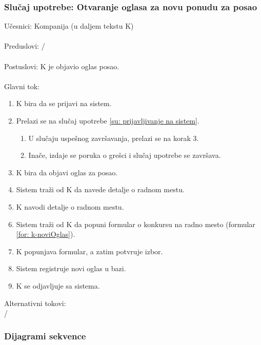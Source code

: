 \subsubsection{Slu\v caj upotrebe: Otvaranje oglasa za novu ponudu za posao}
\label{su: otvaranje oglasa za novu ponudu za posao}

\noindent U\v cesnici: Kompanija (u daljem tekstu K)
\\
\\ Preduslovi: /
\\
\\ Postuslovi: K je objavio oglas posao.
\\ 
\\ Glavni tok:
\begin{enumerate}
	\item K bira da se prijavi na sistem.
	\item Prelazi se na slu\v caj upotrebe \ref{su: prijavljivanje na sistem}.
	\begin{enumerate}
		\item U slu\v caju uspe\v snog zavr\v savanja, prelazi se na korak 3.
		\item Ina\v ce, izdaje se poruka o gre\v sci i slu\v caj upotrebe se zavr\v sava.
	\end{enumerate}
	\item K bira da objavi oglas za posao.
	\item Sistem tra\v zi od K da navede detalje o radnom mestu.
	\item K navodi detalje o radnom mestu.
	\item Sistem tra\v zi od K da popuni formular o konkursu na radno mesto (formular \ref{for: k-noviOglas}).
	\item K popunjava formular, a zatim potvr\dj uje izbor.
	\item Sistem registruje novi oglas u bazi.
	\item K se odjavljuje sa sistema.
\end{enumerate}

\noindent Alternativni tokovi: 
\\/

\subsubsection{Dijagrami sekvence}

